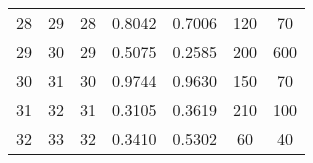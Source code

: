 \begin{table}[]
\begin{adjustbox}{width=1.1\textwidth,center=\textwidth}
\begin{tabular}{@{}ccccccc@{}}
28                                                             & 29                                                             & 28                                                   & 0.8042                                                                         & 0.7006                                                                         & 120                                                                              & 70                                                                                   \\
29                                                             & 30                                                             & 29                                                   & 0.5075                                                                         & 0.2585                                                                         & 200                                                                              & 600                                                                                  \\
30                                                             & 31                                                             & 30                                                   & 0.9744                                                                         & 0.9630                                                                         & 150                                                                              & 70                                                                                   \\
31                                                             & 32                                                             & 31                                                   & 0.3105                                                                         & 0.3619                                                                         & 210                                                                              & 100                                                                                  \\
32                                                             & 33                                                             & 32                                                   & 0.3410                                                                         & 0.5302                                                                         & 60                                                                               & 40                                                                                   \\ \bottomrule
\end{tabular}
\end{adjustbox}
\end{table}

